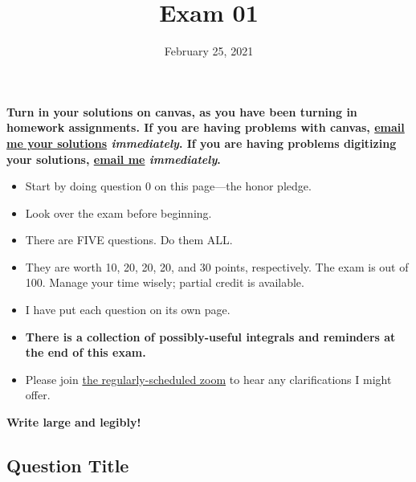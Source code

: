 \usepackage{amsmath,amssymb}
\usepackage{bm}
\usepackage{comment}
\usepackage{graphicx}
\usepackage[dvipsnames]{xcolor}
\usepackage{tikz}
\usepackage{tkz-euclide}
\usepackage{slashed}
\usepackage[
    colorlinks=true,
    allcolors=blue
]{hyperref}



\providecommand{\repositoryInformationSetup}{} %
\repositoryInformationSetup




\pointsinleftmargin 
{}
\extrawidth{-0.5in}


\title{Exam 01}
\contact
\date{February 25, 2021}

\maketitle

{\bf Turn in your solutions on canvas, as you have been turning in homework assignments.  If you are having problems with canvas, \href{mailto:evanb@umd.edu}{email me your solutions} \emph{immediately}.  If you are having problems digitizing your solutions, \href{mailto:evanb@umd.edu}{email me} \emph{immediately}.}

\begin{itemize}
	\item	Start by doing question 0 on this page---the honor pledge.
	\item	Look over the exam before beginning.
	\item	There are FIVE questions.  Do them ALL.
	\item	They are worth 10, 20, 20, 20, and 30 points, respectively.  The exam is out of 100.  Manage your time wisely; partial credit is available.
	\item	I have put each question on its own page.  
	\item	{\bf There is a collection of possibly-useful integrals and reminders at the end of this exam.}
	\item	Please join \href{https://umd.zoom.us/j/96037839765?pwd=c0FYMEVteHlKbkJNSU1JUko3RHZ5QT09}{the regularly-scheduled zoom} to hear any clarifications I might offer.
\end{itemize}

{\bf Write large and legibly!}


\begin{questions}
	\clearpage
	\section*{Question Title}
	
\end{questions}

\ifprintanswers
\else
	\clearpage
	
\fi

